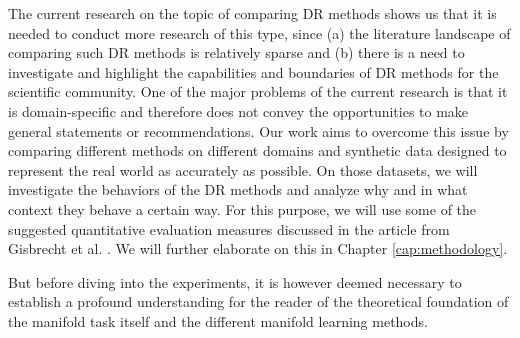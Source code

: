 The current research on the topic of comparing DR methods shows us that it is needed to conduct more research of this type, since (a) the literature landscape of comparing such DR methods is relatively sparse and (b) there is a need to investigate and highlight the capabilities and boundaries of DR methods for the scientific community. One of the major problems of the current research is that it is domain-specific and therefore does not convey the opportunities to make general statements or recommendations. Our work aims to overcome this issue by comparing different methods on different domains and synthetic data designed to represent the real world as accurately as possible. On those datasets, we will investigate the behaviors of the DR methods and analyze why and in what context they behave a certain way. For this purpose, we will use some of the suggested quantitative evaluation measures discussed in the article from Gisbrecht et al. \cite{Gisbrecht15}. We will further elaborate on this in Chapter \ref{cap:methodology}.

But before diving into the experiments, it is however deemed necessary to establish a profound understanding for the reader of the theoretical foundation of the manifold task itself and the different manifold learning methods.